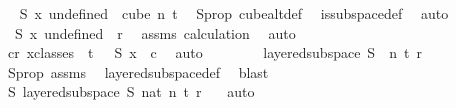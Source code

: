 \begin{isabellebody}
\ \isamarkupfalse%
\ {\isachardoublequoteopen}S\ {\isacharparenleft}{\kern0pt}{\isasymlambda}x{\isachardot}{\kern0pt}\ undefined{\isacharparenright}{\kern0pt}\ {\isasymin}\ cube\ n\ {\isacharparenleft}{\kern0pt}t{\isacharplus}{\kern0pt}{}{\isacharparenright}{\kern0pt}{\isachardoublequoteclose}\ \isamarkupfalse%
\ S{\isacharunderscore}{\kern0pt}prop\ cube{}{\isacharunderscore}{\kern0pt}alt{\isacharunderscore}{\kern0pt}def\ \isamarkupfalse%
\ is{\isacharunderscore}{\kern0pt}subspace{\isacharunderscore}{\kern0pt}def\ \isamarkupfalse%
\ auto\isanewline
\ \ \ \ \isamarkupfalse%
\ \isamarkupfalse%
\ {\isachardoublequoteopen}{\isasymchi}\ {\isacharparenleft}{\kern0pt}S\ {\isacharparenleft}{\kern0pt}{\isasymlambda}x{\isachardot}{\kern0pt}\ undefined{\isacharparenright}{\kern0pt}{\isacharparenright}{\kern0pt}\ {\isacharless}{\kern0pt}\ r{\isachardoublequoteclose}\ \isamarkupfalse%
\ assms\ calculation\ \isamarkupfalse%
\ auto\isanewline
\ \ \ \ \isamarkupfalse%
\ \isamarkupfalse%
\ {\isachardoublequoteopen}{\isasymexists}c{\isacharless}{\kern0pt}r{\isachardot}{\kern0pt}\ {\isasymforall}x{\isasymin}classes\ {}\ t\ {}{\isachardot}{\kern0pt}\ {\isasymchi}\ {\isacharparenleft}{\kern0pt}S\ x{\isacharparenright}{\kern0pt}\ {\isacharequal}{\kern0pt}\ c{\isachardoublequoteclose}\ \isamarkupfalse%
\ auto\isanewline
\ \ \isamarkupfalse%
\isanewline
\ \ \isamarkupfalse%
\ \isamarkupfalse%
\ {\isachardoublequoteopen}layered{\isacharunderscore}{\kern0pt}subspace\ S\ {}\ n\ t\ r\ {\isasymchi}{\isachardoublequoteclose}\ \isamarkupfalse%
\ S{\isacharunderscore}{\kern0pt}prop\ assms\ \isamarkupfalse%
\ layered{\isacharunderscore}{\kern0pt}subspace{\isacharunderscore}{\kern0pt}def\ \isamarkupfalse%
\ blast\isanewline
\ \ \isamarkupfalse%
\ \isamarkupfalse%
\ {\isachardoublequoteopen}{\isasymexists}S{\isachardot}{\kern0pt}\ layered{\isacharunderscore}{\kern0pt}subspace\ S\ {\isacharparenleft}{\kern0pt}{}{\isacharcolon}{\kern0pt}{\isacharcolon}{\kern0pt}nat{\isacharparenright}{\kern0pt}\ n\ t\ r\ {\isasymchi}{\isachardoublequoteclose}\ \isamarkupfalse%
\ auto\isanewline
{}\isamarkupfalse%
%
\endisatagproof
{\isafoldproof}%
%
\isadelimproof
%
\endisadelimproof

\end{isabellebody}
